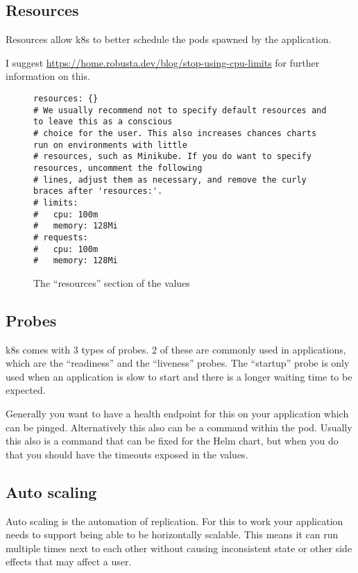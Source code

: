 \subsection{Resources}
Resources allow \gls{k8s} to better schedule the pods spawned by the application.

I suggest \url{https://home.robusta.dev/blog/stop-using-cpu-limits} for further information on this.

\begin{figure}[h]
\begin{verbatim}
resources: {}
# We usually recommend not to specify default resources and to leave this as a conscious
# choice for the user. This also increases chances charts run on environments with little
# resources, such as Minikube. If you do want to specify resources, uncomment the following
# lines, adjust them as necessary, and remove the curly braces after 'resources:'.
# limits:
#   cpu: 100m
#   memory: 128Mi
# requests:
#   cpu: 100m
#   memory: 128Mi
\end{verbatim}
\caption{The \enquote{resources} section of the \gls{values}}\label{code:resources_section}
\end{figure}

\subsection{Probes}
\Gls{k8s} comes with 3 types of probes\cite{ConfigureLivenessReadiness}.
2 of these are commonly used in applications, which are the \enquote{readiness} and the \enquote{liveness} probes.
The \enquote{startup} probe is only used when an application is slow to start and there is a longer waiting time to be expected.

Generally you want to have a health endpoint for this on your application which can be pinged.
Alternatively this also can be a command within the pod.
Usually this also is a command that can be fixed for the Helm chart, but when you do that you should have the timeouts exposed in the \gls{values}.

\subsection{Auto scaling}
Auto scaling is the automation of replication.
For this to work your application needs to support being able to be horizontally scalable.
This means it can run multiple times next to each other without causing inconsistent state or other side effects that may affect a user.

